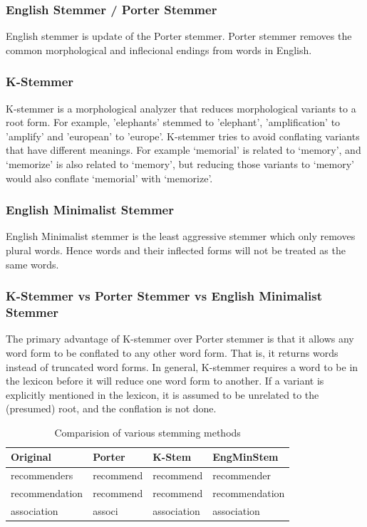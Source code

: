 \documentclass[report,draft*]{aaltoseries}
\begin{document}
\subsubsection{English Stemmer / Porter Stemmer}
English stemmer is update of the Porter stemmer. Porter stemmer \cite{Porter80} \cite{Porter01} removes the common morphological and inflecional endings from words in English.
\subsubsection{K-Stemmer}
K-stemmer \cite{Krovetz93} is a morphological analyzer that reduces morphological variants to a root form.  For example, 'elephants' stemmed to 'elephant', 'amplification' to 'amplify' and 'european' to 'europe'. K-stemmer tries to avoid conflating variants that have different meanings.  For example `memorial' is related to `memory', and `memorize' is also related to `memory', but reducing those variants to `memory' would also conflate `memorial' with `memorize'.
\subsubsection{English Minimalist Stemmer}
English Minimalist stemmer is the least aggressive stemmer which only removes plural words. Hence words and their inflected forms will not be treated as the same words.

\subsubsection{K-Stemmer vs Porter Stemmer vs English Minimalist Stemmer}
The primary advantage of K-stemmer over Porter stemmer is that it allows any word form to be conflated to any other word form. That is, it returns words instead of truncated word forms. In general, K-stemmer requires a word to be in the lexicon  before it will reduce one word form to another. If a variant is explicitly mentioned in the lexicon, it is assumed to be unrelated to the (presumed) root, and the conflation is not done. 

\begin{table}[ht!]
\centering
\caption{Comparision of various stemming methods}
\label{tblstem}
\begin{tabular}{@{}llll@{}}
\toprule
Original       & Porter    & K-Stem       & EngMinStem     \\ \midrule
recommenders   & recommend & recommend   & recommender    \\
recommendation & recommend & recommend   & recommendation \\
association    & associ    & association & association    \\ \bottomrule
\end{tabular}
\end{table}
\end{document}
